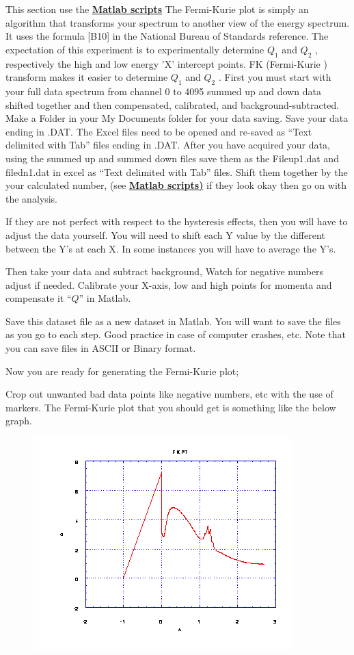 \documentclass{../lab}
\begin{document}
This section use the \href{http://experimentationlab.berkeley.edu/matlabfitting}{\textbf{Matlab scripts}} The Fermi-Kurie plot is simply an algorithm that transforms your spectrum to another view of the energy spectrum. It uses the formula [B10] in the National Bureau of Standards reference. The expectation of this experiment is to experimentally determine $Q_1$ and $Q_2$ , respectively the high and low energy 'X' intercept points. FK (Fermi-Kurie ) transform makes it easier to determine $Q_1$ and $Q_2$ . First you must start with your full data spectrum from channel 0 to 4095 summed up and down data shifted together and then compensated, calibrated, and background-subtracted. Make a Folder in your My Documents folder for your data saving. Save your data ending in \*.DAT. The Excel files need to be opened and re-saved as ``Text delimited with Tab'' files ending in \*.DAT. After you have acquired your data, using the summed up and summed down files save them as the Fileup1.dat and filedn1.dat in excel as ``Text delimited with Tab'' files. Shift them together by the your calculated number, (see \href{http://experimentationlab.berkeley.edu/matlabfitting}{\textbf{Matlab scripts)}} if they look okay then go on with the analysis.

If they are not perfect with respect to the hysteresis effects, then you will have to adjust the data yourself. You will need to shift each Y value by the different between the Y's at each X. In some instances you will have to average the Y's.

Then take your data and subtract background, Watch for negative numbers adjust if needed. Calibrate your X-axis, low and high points for momenta and compensate it ``$Q$'' in Matlab.

Save this dataset file as a new dataset in Matlab. You will want to save the files as you go to each step. Good practice in case of computer crashes, etc. Note that you can save files in ASCII or Binary format.

Now you are ready for generating the Fermi-Kurie plot;

Crop out unwanted bad data points like negative numbers, etc with the use of markers. The Fermi-Kurie plot that you should get is something like the below graph.
\begin{figure}[h]
\centering
    \href{http://experimentationlab.berkeley.edu/sites/default/files/images/BRAimage019.gif}{\includegraphics[width=0.5\linewidth]{images/BRAimage019.png}}
    \caption{}
\end{figure}
\end{document}
